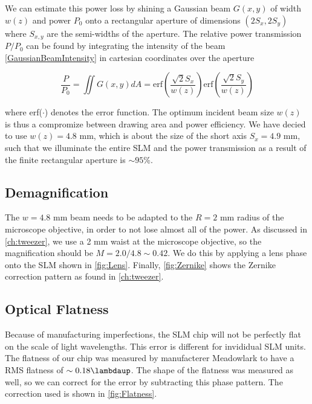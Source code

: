 We can estimate this power loss by shining a Gaussian beam $G(x,y)$ of width $w(z)$ and power $P_0$ onto a rectangular aperture of dimensions $(2S_x, 2S_y)$ where $S_{x,y}$ are the semi-widths of the aperture. 
The relative power transmission $P/P_0$ can be found by integrating the intensity of the beam \cref{GaussianBeamIntensity} in cartesian coordinates over the aperture

\begin{equation}\label{RectAperturePower}
    \frac{P}{P_0} =
    \iint G(x,y) dA=
    \text{erf}\left(\frac{\sqrt{2}S_x}{w(z)}\right) \text{erf}\left(\frac{\sqrt{2}S_y}{w(z)}\right)
\end{equation}

where erf($\cdot$) denotes the error function. 
The optimum incident beam size $w(z)$ is thus a compromize between drawing area and power efficiency. 
We have decied to use $w(z) = 4.8$ mm, which is about the size of the short axis $S_x = 4.9$ mm, such that we illuminate the entire \ac{SLM} and the power transmission as a result of the finite rectangular aperture is $\sim 95$\%.

\subsection{Demagnification}

The $w = 4.8$ mm beam needs to be adapted to the $R = 2$ mm radius of the microscope objective, in order to not lose almost all of the power. 
As discussed in \cref{ch:tweezer}, we use a 2 mm waist at the microscope objective, so the magnification should be $M = 2.0 / 4.8 \sim 0.42$. 
We do this by applying a lens phase onto the SLM shown in \cref{fig:Lens}. 
Finally, \cref{fig:Zernike} shows the Zernike correction pattern as found in \cref{ch:tweezer}.

\subsection{Optical Flatness}\label{subsec:Flatness}

Because of manufacturing imperfections, the SLM chip will not be perfectly flat on the scale of light wavelengths. 
This error is different for invididual SLM units.
The flatness of our chip was measured by manufacterer Meadowlark to have a RMS flatness of $\sim 0.18\lambdaup$.
The shape of the flatness was measured as well, so we can correct for the error by subtracting this phase pattern. 
The correction used is shown in \cref{fig:Flatness}.

